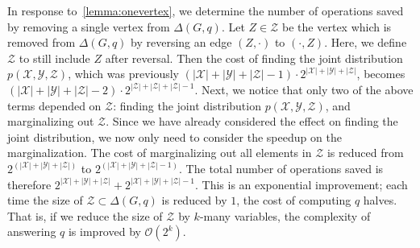 \null \quad \quad In response to~\cref{lemma:onevertex}, we determine the number of operations saved by removing a single vertex from $\Delta(G,q)$. Let $Z \in \mathcal{Z}$ be the vertex which is removed from $\Delta(G,q)$ by reversing an edge $(Z,\cdot)$ to $(\cdot, Z)$. Here, we define $\mathcal{Z}$ to still include $Z$ after reversal. Then the cost of finding the joint distribution $p(\mathcal{X}, \mathcal{Y}, \mathcal{Z})$, which was previously $(|\mathcal{X}|+|\mathcal{Y}|+|\mathcal{Z}|-1)\cdot 2^{|\mathcal{X}|+|\mathcal{Y}|+|\mathcal{Z}|}$, becomes $(|\mathcal{X}|+|\mathcal{Y}|+|\mathcal{Z}|-2)\cdot 2^{|\mathcal{Z}|+|\mathcal{Z}|+|\mathcal{Z}|-1}$. \newline
\null \quad \quad Next, we notice that only two of the above terms depended on $\mathcal{Z}$: finding the joint distribution $p(\mathcal{X},\mathcal{Y},\mathcal{Z})$, and marginalizing out $\mathcal{Z}$. Since we have already considered the effect on finding the joint distribution, we now only need to consider the speedup on the marginalization. The cost of marginalizing out all elements in $\mathcal{Z}$ is reduced from $2^{(|\mathcal{X}|+|\mathcal{Y}|+|\mathcal{Z}|)}$ to $2^{(|\mathcal{X}|+|\mathcal{Y}|+|\mathcal{Z}|-1)}$. \newline
\null \quad \quad The total number of operations saved is therefore $2^{|\mathcal{X}|+|\mathcal{Y}|+|\mathcal{Z}|} + 2^{|\mathcal{X}|+|\mathcal{Y}|+|\mathcal{Z}|-1}$. This is an exponential improvement; each time the size of $\mathcal{Z} \subset \Delta(G,q)$ is reduced by $1$, the cost of computing $q$ halves. That is, if we reduce the size of $\mathcal{Z}$ by $k$-many variables, the complexity of answering $q$ is improved by $\mathcal{O}(2^{k}).$